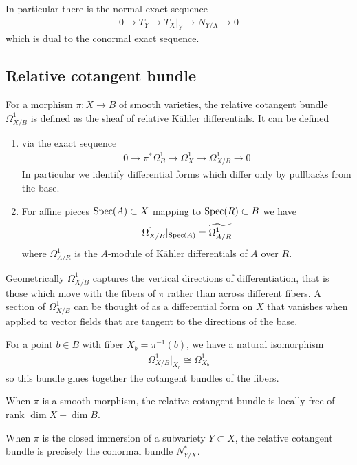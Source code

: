 \documentclass[12pt]{article}
\begin{document}
In particular there is the normal exact sequence
\begin{align*}
    0 \to T_Y \to T_X\vert_Y \to N_{Y/X} \to 0
\end{align*} which is dual to the conormal exact sequence.

\subsection{Relative cotangent bundle}
For a morphism $\pi:X\to B$ of smooth varieties, the relative cotangent bundle $\Omega^1_{X/B}$ is defined as the sheaf of relative Kähler differentials. It can be defined 
\begin{enumerate}
    \item via the exact sequence
    \begin{align*}
        0 \to \pi^*\Omega^1_B \to \Omega^1_X \to \Omega^1_{X/B} \to 0
    \end{align*} In particular we identify differential forms which differ only by pullbacks from the base.
    \item For affine pieces $\operatorname{Spec}(A) \subset X$ mapping to $\operatorname{Spec}(R)\subset B$ we have \begin{align*}
        \Omega^1_{X/B}\vert_{\operatorname{Spec}(A)} = \widetilde{\Omega^1_{A/R}} 
    \end{align*} where $\Omega^1_{A/R}$ is the $A$-module of Kähler differentials of $A$ over $R$.
\end{enumerate} 

Geometrically $\Omega^1_{X/B}$ captures the vertical directions of differentiation, that is those which move with the fibers of $\pi$ rather than across different fibers. A section of $\Omega^1_{X/B}$ can be thought of as a differential form on $X$ that vanishes when applied to vector fields that are tangent to the directions of the base.

For a point $b\in B$ with fiber $X_b = \pi^{-1}(b)$, we have a natural isomorphism \begin{align*}
    \Omega^1_{X/B}\vert_{X_b} \cong \Omega^1_{X_b}
\end{align*} so this bundle glues together the cotangent bundles of the fibers.

\begin{remark}
    When $\pi$ is a smooth morphism, the relative cotangent bundle is locally free of rank $\dim X - \dim B$.

    When $\pi$ is the closed immersion of a subvariety $Y\subset X$, the relative cotangent bundle is precisely the conormal bundle $N^*_{Y/X}$.
\end{remark}
\end{document}
